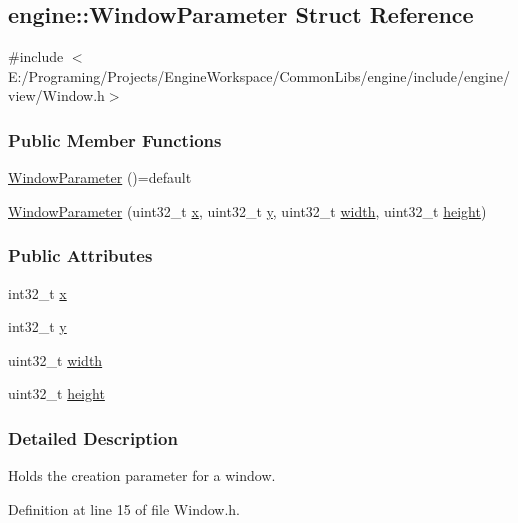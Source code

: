\hypertarget{a00091}{}\subsection{engine\+:\+:Window\+Parameter Struct Reference}
\label{a00091}


{\ttfamily \#include $<$E\+:/\+Programing/\+Projects/\+Engine\+Workspace/\+Common\+Libs/engine/include/engine/view/\+Window.\+h$>$}

\subsubsection*{Public Member Functions}
\begin{DoxyCompactItemize}
\item 
\hyperlink{a00091_ac4c0175c0aa56acbcd3e8ba73b803821}{Window\+Parameter} ()=default
\item 
\hyperlink{a00091_a0872d548da562e6a4ed40f12d151b6a5}{Window\+Parameter} (uint32\+\_\+t \hyperlink{a00091_a1ae6e0c7a9ad94617c7b8e3c54faabf5}{x}, uint32\+\_\+t \hyperlink{a00091_a9f6e5adf0cb73c89ebdfe0c993d299fd}{y}, uint32\+\_\+t \hyperlink{a00091_a068d271ecfc95b7c3dcf19e43b2a65f4}{width}, uint32\+\_\+t \hyperlink{a00091_a9a2039d074f22d4c639ef5254fc30fb7}{height})
\end{DoxyCompactItemize}
\subsubsection*{Public Attributes}
\begin{DoxyCompactItemize}
\item 
int32\+\_\+t \hyperlink{a00091_a1ae6e0c7a9ad94617c7b8e3c54faabf5}{x}
\item 
int32\+\_\+t \hyperlink{a00091_a9f6e5adf0cb73c89ebdfe0c993d299fd}{y}
\item 
uint32\+\_\+t \hyperlink{a00091_a068d271ecfc95b7c3dcf19e43b2a65f4}{width}
\item 
uint32\+\_\+t \hyperlink{a00091_a9a2039d074f22d4c639ef5254fc30fb7}{height}
\end{DoxyCompactItemize}


\subsubsection{Detailed Description}
Holds the creation parameter for a window. 

Definition at line 15 of file Window.\+h.



